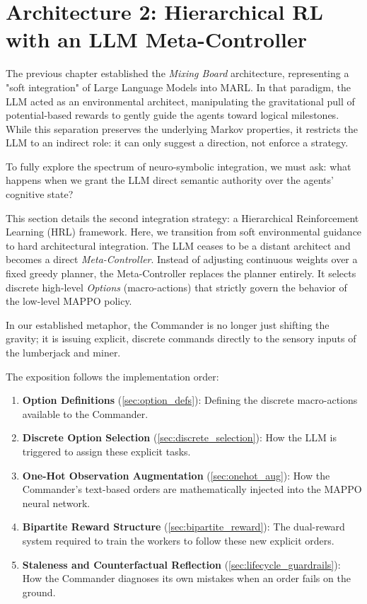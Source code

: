 \section{Architecture 2: Hierarchical RL with an LLM Meta-Controller}
\label{ch:hrl_architecture}

The previous chapter established the \emph{Mixing Board} architecture, representing a "soft integration" of Large Language Models into MARL. In that paradigm, the LLM acted as an environmental architect, manipulating the gravitational pull of potential-based rewards to gently guide the agents toward logical milestones. While this separation preserves the underlying Markov properties, it restricts the LLM to an indirect role: it can only suggest a direction, not enforce a strategy. 

To fully explore the spectrum of neuro-symbolic integration, we must ask: what happens when we grant the LLM direct semantic authority over the agents' cognitive state?

This section details the second integration strategy: a Hierarchical Reinforcement Learning (HRL) framework. Here, we transition from soft environmental guidance to hard architectural integration. The LLM ceases to be a distant architect and becomes a direct \emph{Meta-Controller}. Instead of adjusting continuous weights over a fixed greedy planner, the Meta-Controller replaces the planner entirely. It selects discrete high-level \emph{Options} (macro-actions) that strictly govern the behavior of the low-level MAPPO policy.

In our established metaphor, the Commander is no longer just shifting the gravity; it is issuing explicit, discrete commands directly to the sensory inputs of the lumberjack and miner.

The exposition follows the implementation order:
\begin{enumerate}
    \item \textbf{Option Definitions} (\cref{sec:option_defs}): Defining the discrete macro-actions available to the Commander.
    \item \textbf{Discrete Option Selection} (\cref{sec:discrete_selection}): How the LLM is triggered to assign these explicit tasks.
    \item \textbf{One-Hot Observation Augmentation} (\cref{sec:onehot_aug}): How the Commander's text-based orders are mathematically injected into the MAPPO neural network.
    \item \textbf{Bipartite Reward Structure} (\cref{sec:bipartite_reward}): The dual-reward system required to train the workers to follow these new explicit orders.
    \item \textbf{Staleness and Counterfactual Reflection} (\cref{sec:lifecycle_guardrails}): How the Commander diagnoses its own mistakes when an order fails on the ground.
\end{enumerate}

